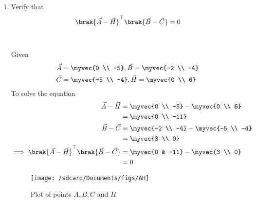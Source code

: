 \documentclass[11pt]{book}
\begin{document}
\begin{enumerate}[label=\thesection.\arabic*.,ref=\thesection.\theenumi]
\item Verify that 
		\begin{align}
			\brak{\vec{A}-\vec{H}}^{\top}\brak{\vec{B}-\vec{C}} = 0
		\end{align}\\
  \solution\\
Given
\begin{align}
            \vec{A} &= \myvec{0 \\ -5}, \vec{B} = \myvec{-2 \\ -4}\\
            \vec{C} &= \myvec{-5 \\ -4}, \vec{H} = \myvec{0 \\ 6}
\end{align}
To solve the equation
\begin{align}
\vec{A}-\vec{H} &= \myvec{0 \\ -5} - \myvec{0 \\ 6}\\
                &= \myvec{0 \\ -11}\\
\vec{B}-\vec{C} &= \myvec{-2 \\ -4} - \myvec{-5 \\ -4}\\
                &= \myvec{3 \\ 0}\\
	\implies \brak{\vec{A}-\vec{H}}^{\top}\brak{\vec{B}-\vec{C}} &= \myvec{0 & -11} - \myvec{3 \\ 0}\\
                &= 0
\end{align}
\begin{figure}[H]
\texttt{[image: /sdcard/Documents/figs/AH]}
\caption{Plot of points $A, B, C$ and $H$}
\label{fig1:Points}
\end{figure}

\latexprintindex

\end{enumerate}
\end{document}
